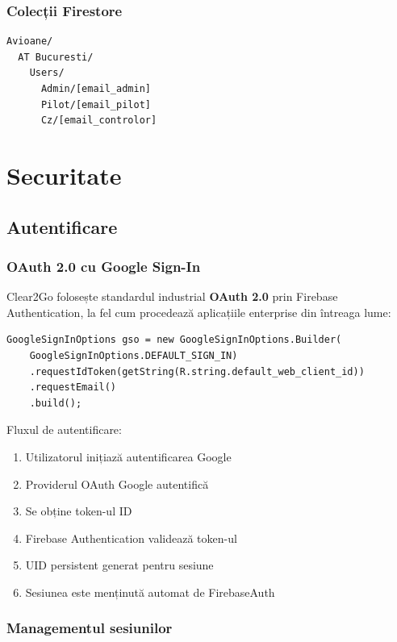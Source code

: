 \documentclass[11pt,a4paper]{report}
\begin{document}
\subsection{Colecții Firestore}

\begin{lstlisting}
Avioane/
  AT Bucuresti/
    Users/
      Admin/[email_admin]
      Pilot/[email_pilot]
      Cz/[email_controlor]
\end{lstlisting}

\chapter{Securitate}

\section{Autentificare}

\subsection{OAuth 2.0 cu Google Sign-In}

Clear2Go folosește standardul industrial \textbf{OAuth 2.0} prin Firebase Authentication,
la fel cum procedează aplicațiile enterprise din întreaga lume:

\begin{lstlisting}
GoogleSignInOptions gso = new GoogleSignInOptions.Builder(
    GoogleSignInOptions.DEFAULT_SIGN_IN)
    .requestIdToken(getString(R.string.default_web_client_id))
    .requestEmail()
    .build();
\end{lstlisting}

Fluxul de autentificare:
\begin{enumerate}
    \item Utilizatorul inițiază autentificarea Google
    \item Providerul OAuth Google autentifică
    \item Se obține token-ul ID
    \item Firebase Authentication validează token-ul
    \item UID persistent generat pentru sesiune
    \item Sesiunea este menținută automat de FirebaseAuth
\end{enumerate}

\subsection{Managementul sesiunilor}
\end{document}
